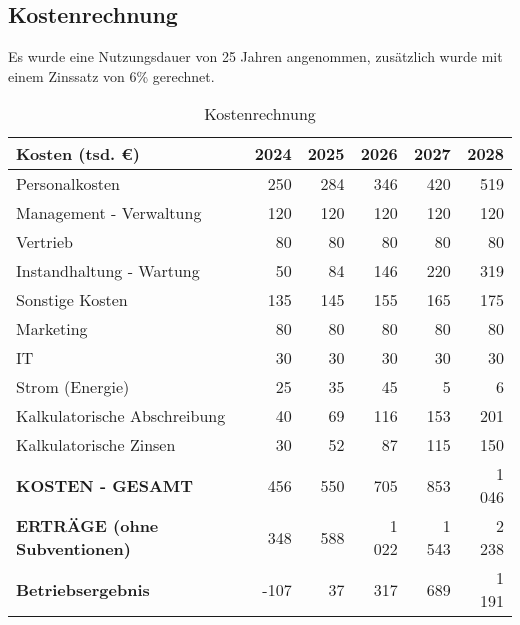 \subsection{Kostenrechnung}

Es wurde eine Nutzungsdauer von 25 Jahren angenommen, zusätzlich wurde mit einem Zinssatz von 6\% gerechnet.

\begin{table}[H]
  \centering
  \begin{tabular}{lrrrrr}
    \toprule
    \textbf{Kosten} (tsd. \euro)         & \textbf{2024} & \textbf{2025} & \textbf{2026} & \textbf{2027} & \textbf{2028} \\
    \midrule
    Personalkosten                       & 250           & 284           & 346           & 420           & 519           \\
    Management - Verwaltung              & 120           & 120           & 120           & 120           & 120           \\
    Vertrieb                             & 80            & 80            & 80            & 80            & 80            \\
    Instandhaltung - Wartung             & 50            & 84            & 146           & 220           & 319           \\
    Sonstige Kosten                      & 135           & 145           & 155           & 165           & 175           \\
    Marketing                            & 80            & 80            & 80            & 80            & 80            \\
    IT                                   & 30            & 30            & 30            & 30            & 30            \\
    Strom (Energie)                      & 25            & 35            & 45            & 5             & 6             \\
    Kalkulatorische Abschreibung         & 40            & 69            & 116           & 153           & 201           \\
    Kalkulatorische Zinsen               & 30            & 52            & 87            & 115           & 150           \\
    \midrule
    \textbf{KOSTEN - GESAMT}             & 456           & 550           & 705           & 853           & 1 046         \\
    \textbf{ERTRÄGE (ohne Subventionen)} & 348           & 588           & 1 022         & 1 543         & 2 238         \\
    \midrule
    \textbf{Betriebsergebnis}            & -107          & 37            & 317           & 689           & 1 191         \\
    \bottomrule
  \end{tabular}
  \caption{Kostenrechnung}
  \label{tab:kostenrechnung}
\end{table}